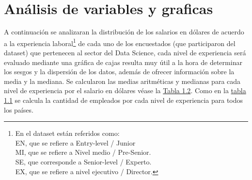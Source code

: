 \documentclass{article}
\begin{document}
	\section{Análisis de variables y graficas}
	A continuación se analizaran la distribución de los salarios en dólares de acuerdo a la experiencia laboral\footnote{En el dataset están referidos como:
		\\EN, que se refiere a Entry-level / Junior
		\\MI, que se refiere a Nivel medio / Pre-Senior.
		\\SE, que corresponde a Senior-level / Experto.
		\\EX, que se refiere a nivel ejecutivo / Director.}
de cada uno de los encuestados (que participaron del dataset) que pertenecen al sector del Data Science, cada nivel de experiencia será evaluado mediante una gráfica de cajas resulta muy útil a la hora de determinar los sesgos y la dispersión de los datos, además de ofrecer información sobre la media y la mediana. Se calcularon las medias aritméticas y medianas para cada nivel de experiencia por el salario en dólares véase la \hyperref[tabla 1.2]{Tabla 1.2}. Como en la \hyperref[tabla 1.1]{tabla 1.1} se calcula la cantidad de empleados por cada nivel de experiencia para todos los países.
	
\end{document}
